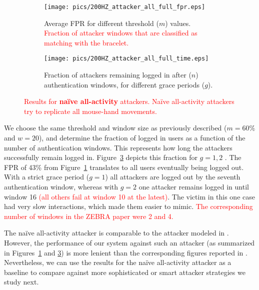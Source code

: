 \documentclass[conference]{IEEEtran}
\newcommand{\zebra}{ZEBRA\xspace}
\newcommand{\allactivity}{all-activity\xspace}
\newcommand\changeMika[1]{\textcolor{red}{#1}}
\newcommand\changeMika[1]{{#1}}
\newcommand{\figwidth}{\columnwidth}
\begin{document}
\else

\begin{figure}[t!]
	\centering
	\begin{subfigure}[b]{\figwidth}
	\centering
		\texttt{[image: pics/200HZ\_attacker\_all\_full\_fpr.eps]}
		\caption{Average FPR for different threshold ($m$) values. \changeMika{Fraction of attacker windows that are classified as matching with the bracelet.}}
		\label{fig:all_full_fpr}
	\end{subfigure}

	\begin{subfigure}[!b]{\figwidth}
	\centering
		\texttt{[image: pics/200HZ\_attacker\_all\_full\_time.eps]}
		\caption{Fraction of attackers remaining logged in
                  after ($n$) authentication windows, for different grace periods ($g$).}
		\label{fig:all_full_time}
	\end{subfigure}
\caption{\changeMika{Results for \textbf{na\"ive \allactivity} attackers. Na\"ive \allactivity attackers try to replicate all mouse-hand movements.}}
\end{figure}

\fi

We choose the same threshold and window size as previously described ($m=60\%$ and $w=20$), and determine the fraction of logged in users as a function of the number of authentication windows. This represents how long the attackers successfully remain logged in. Figure~\ref{fig:all_full_time} depicts this fraction for $g=1,2$ . The FPR of 43\% from Figure~\ref{fig:all_full_fpr} translates to all users eventually being logged out. With a strict grace period ($g=1$) all attackers are logged out by the seventh authentication window, whereas with $g=2$ one attacker remains logged in until window 16 \changeMika{(all others fail at window 10 at the latest)}. The victim in this one case had very slow interactions, which made them easier to mimic. \changeMika{The corresponding number of windows in the \zebra paper \cite{mare2014zebra} were 2 and 4.}

The na\"ive \allactivity attacker is comparable to the attacker modeled in \cite{mare2014zebra}. However, the performance of our system against such an attacker (as summarized in Figures~\ref{fig:all_full_fpr} and \ref{fig:all_full_time}) is more lenient than the corresponding figures reported in \cite{mare2014zebra}. Nevertheless, we can use the results for the na\"ive \allactivity attacker as a baseline to compare against more sophisticated or smart attacker strategies we study next.
\end{document}
